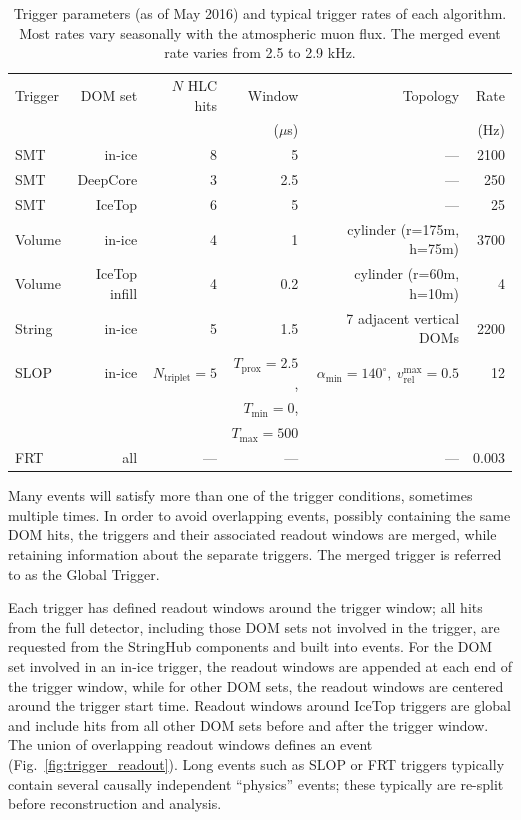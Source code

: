 \begin{table}
  \centering \footnotesize
\caption{Trigger parameters (as of May 2016) and typical trigger
  rates of each algorithm.  Most rates vary seasonally with the atmospheric
  muon flux.  The merged event rate varies from 2.5 to
  2.9 kHz.}  
\begin{tabular}{lrrrrr}
  \hline Trigger & DOM set & $N$ HLC hits & Window & Topology & Rate\\
  & & & ($\mu$s) & & (Hz) \\
  \hline
  SMT & in-ice & 8 & 5 & --- & 2100\\
  SMT & DeepCore & 3 & 2.5 & --- & 250\\
  SMT & IceTop & 6 & 5 & --- & 25\\
  Volume & in-ice & 4 & 1 & cylinder (r=175m, h=75m) & 3700\\
  Volume & IceTop infill & 4 & 0.2 & cylinder (r=60m, h=10m) & 4\\
  String & in-ice & 5 & 1.5 & 7 adjacent vertical DOMs & 2200\\
  SLOP & in-ice & $N_{\mathrm{triplet}} = 5$ & $T_{\mathrm{prox}} = 2.5$, &
  $\alpha_{\mathrm{min}} = 140^\circ,\ v_{\mathrm{rel}}^{\mathrm{max}}
  = 0.5$ & 12\\
  & & & $T_{\mathrm{min}} = 0$, & &\\
  & & & $T_{\mathrm{max}} = 500$ & &\\
  FRT & all & --- & --- & --- & 0.003\\
  \hline
\end{tabular}
\label{tab:triggers}
\end{table}

Many events will satisfy more than one of the trigger conditions, sometimes
multiple times.  In order to avoid overlapping events, possibly containing
the same DOM hits, the triggers and their associated readout windows are
merged, while retaining information about the separate triggers.  The
merged trigger is referred to as the Global Trigger.

Each trigger has defined readout windows around the trigger window; all
hits from the full detector, including those DOM sets not involved in the trigger,
are requested from the StringHub components and built into events.  For the
DOM set involved in an in-ice trigger, the readout windows are appended at each end of the trigger
window, while for other DOM sets, the readout windows are centered around
the trigger start time.  Readout windows around IceTop triggers are global
and include hits from all other DOM sets before and after the trigger
window. The union of overlapping readout windows defines 
an event (Fig.~\ref{fig:trigger_readout}).  Long events such as SLOP or FRT
triggers typically contain several causally independent ``physics'' events;
these typically are re-split before reconstruction and analysis.

